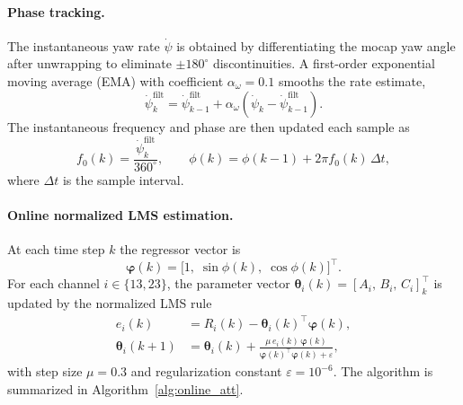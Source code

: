 \paragraph{Phase tracking.}
The instantaneous yaw rate $\dot\psi$ is obtained by differentiating the mocap
yaw angle after unwrapping to eliminate $\pm180^{\circ}$ discontinuities.  A
first-order exponential moving average (EMA) with coefficient $\alpha_\omega =
0.1$ smooths the rate estimate,
\begin{equation}
    \dot\psi_{k}^{\mathrm{filt}}
        = \dot\psi_{k-1}^{\mathrm{filt}}
        + \alpha_\omega\!\left(\dot\psi_k - \dot\psi_{k-1}^{\mathrm{filt}}\right).
    \label{eq:ema_yawrate}
\end{equation}
The instantaneous frequency and phase are then updated each sample as
\begin{equation}
    f_0(k) = \frac{\dot\psi_{k}^{\mathrm{filt}}}{360^{\circ}},
    \qquad
    \phi(k) = \phi(k-1) + 2\pi f_0(k)\,\Delta t,
    \label{eq:phase_int}
\end{equation}
where $\Delta t$ is the sample interval.

\paragraph{Online normalized LMS estimation.}
At each time step $k$ the regressor vector is
\begin{equation}
    \boldsymbol{\varphi}(k)
        = \bigl[1,\;\sin\phi(k),\;\cos\phi(k)\bigr]^{\top}.
\end{equation}
For each channel $i\in\{13,23\}$, the parameter vector
$\boldsymbol{\theta}_i(k) = [A_i,\,B_i,\,C_i]_k^{\top}$ is updated by the
normalized LMS rule
\begin{align}
    e_i(k) &= R_i(k) - \boldsymbol{\theta}_i(k)^{\top}\boldsymbol{\varphi}(k),
    \label{eq:nlms_err}\\[2pt]
    \boldsymbol{\theta}_i(k+1)
        &= \boldsymbol{\theta}_i(k)
           + \frac{\mu\,e_i(k)\,\boldsymbol{\varphi}(k)}
                  {\boldsymbol{\varphi}(k)^{\top}\boldsymbol{\varphi}(k)+\varepsilon},
    \label{eq:nlms_update}
\end{align}
with step size $\mu = 0.3$ and regularization constant $\varepsilon = 10^{-6}$.
The algorithm is summarized in Algorithm~\ref{alg:online_att}.


